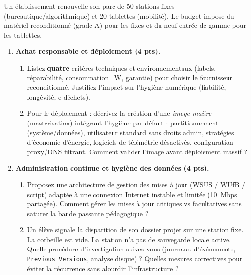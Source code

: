 \documentclass[11pt]{article}
\begin{document}
\begin{exercice}
Un établissement renouvelle son parc de 50 stations fixes (bureautique/algorithmique) et 20 tablettes (mobilité). Le budget impose du matériel reconditionné (grade A) pour les fixes et du neuf entrée de gamme pour les tablettes.

\begin{enumerate}
    \item \textbf{Achat responsable et déploiement (4 pts).} 
    \begin{enumerate}
        \item Listez \textbf{quatre} critères techniques et environnementaux (labels, réparabilité, consommation \SI{}{W}, garantie) pour choisir le fournisseur reconditionné. Justifiez l'impact sur l'hygiène numérique (fiabilité, longévité, e-déchets).
        \item Pour le déploiement : décrivez la création d'une \textit{image maître} (masterisation) intégrant l'hygiène par défaut : partitionnement (système/données), utilisateur standard sans droits admin, stratégies d'économie d'énergie, logiciels de télémétrie désactivés, configuration proxy/DNS filtrant. Comment valider l'image avant déploiement massif ?
    \end{enumerate}

    \item \textbf{Administration continue et hygiène des données (4 pts).} 
    \begin{enumerate}
        \item Proposez une architecture de gestion des mises à jour (WSUS / WUfB / script) adaptée à une connexion Internet instable et limitée (\SI{10}{Mbps} partagée). Comment gérer les mises à jour critiques vs facultatives sans saturer la bande passante pédagogique ?
        \item Un élève signale la disparition de son dossier projet sur une station fixe. La corbeille est vide. La station n'a pas de sauvegarde locale active. Quelle procédure d'investigation suivez-vous (journaux d'événements, \texttt{Previous Versions}, analyse disque) ? Quelles mesures correctives pour éviter la récurrence sans alourdir l'infrastructure ?
    \end{enumerate}


\end{enumerate}
\end{exercice}
\end{document}

